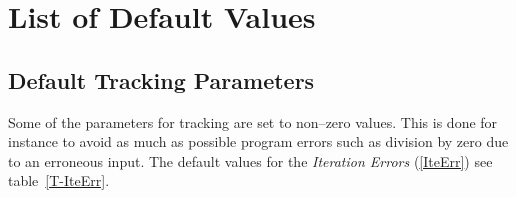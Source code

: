 \chapter{List of Default Values} \label{Default}

\section{Default Tracking Parameters} \label{DTP}

Some of the parameters for tracking are set to non--zero values.
This is done for instance to avoid as much as possible program errors such as division by zero due to an erroneous input.
The default values for the \textit{Iteration Errors} (\ref{IteErr}) see table~\ref{T-IteErr}.

 \setcounter{dtp}{0}

